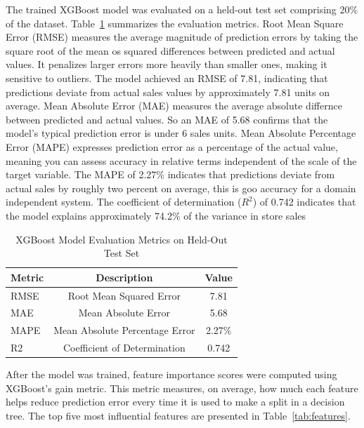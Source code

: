 \documentclass[12pt]{article}
\begin{document}
The trained XGBoost model was evaluated on a held-out test set comprising 20\% of the
dataset. 
Table~\ref{tab:results} summarizes the evaluation metrics. Root Mean Square Error (RMSE) measures the average magnitude of prediction errors by taking the square root of the mean os squared differences between predicted and actual values. It penalizes larger errors more heavily than smaller ones, making it sensitive to outliers. The model achieved an RMSE of 7.81, indicating that predictions deviate from actual sales values by approximately 7.81 units on average.
Mean Absolute Error (MAE) measures the average absolute differnce between predicted and actual values. So an MAE of 5.68 confirms that the model's typical prediction error is under 6 sales units.
Mean Absolute Percentage Error (MAPE) expresses prediction error as a percentage of the actual value, meaning you can assess accuracy in relative terms independent of the scale of the target variable. The MAPE of 2.27\% indicates that predictions deviate from actual sales by roughly two percent on average, this is goo accuracy for a domain independent system.
The coefficient of determination ($R^2$) of 0.742 indicates that the model explains approximately 74.2\% of the variance in store sales 
\begin{table}[b]
  
  \label{tab:results}
  \begin{tabular}{lcc}
  \hline
  \textbf{Metric} & \textbf{Description} & \textbf{Value} \\
    \hline
    RMSE  & Root Mean Squared Error      & 7.81  \\
    MAE   & Mean Absolute Error          & 5.68 \\
    MAPE  & Mean Absolute Percentage Error & 2.27\% \\
    R2 & Coefficient of Determination & 0.742  \\
    \hline
  \end{tabular}
  \centering
  \caption{XGBoost Model Evaluation Metrics on Held-Out Test Set}
\end{table}


After the model was trained, feature importance scores were computed using XGBoost's
gain metric. This metric measures, on average, how much each feature helps reduce prediction error every time it is used to make a split in a decision tree. The top five most influential features are
presented in Table~\ref{tab:features}.
\end{document}
